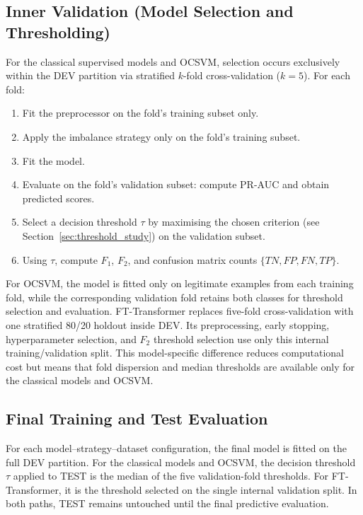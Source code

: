 \subsection{Inner Validation (Model Selection and Thresholding)}
For the classical supervised models and OCSVM, selection occurs exclusively within the DEV partition via stratified $k$-fold cross-validation ($k=5$). For each fold:
\begin{enumerate}
  \item Fit the preprocessor on the fold's training subset only.
  \item Apply the imbalance strategy only on the fold's training subset.
  \item Fit the model.
  \item Evaluate on the fold's validation subset: compute PR-AUC and obtain predicted scores.
  \item Select a decision threshold $\tau$ by maximising the chosen criterion (see Section~\ref{sec:threshold_study}) on the validation subset.
  \item Using $\tau$, compute $F_1$, $F_2$, and confusion matrix counts $\{TN, FP, FN, TP\}$.
\end{enumerate}

For OCSVM, the model is fitted only on legitimate examples from each training fold, while the corresponding validation fold retains both classes for threshold selection and evaluation. FT-Transformer replaces five-fold cross-validation with one stratified 80/20 holdout inside DEV. Its preprocessing, early stopping, hyperparameter selection, and $F_2$ threshold selection use only this internal training/validation split. This model-specific difference reduces computational cost but means that fold dispersion and median thresholds are available only for the classical models and OCSVM.

\raggedbottom
\subsection{Final Training and Test Evaluation}
For each model--strategy--dataset configuration, the final model is fitted on the full DEV partition. For the classical models and OCSVM, the decision threshold $\tau$ applied to TEST is the median of the five validation-fold thresholds. For FT-Transformer, it is the threshold selected on the single internal validation split. In both paths, TEST remains untouched until the final predictive evaluation.

